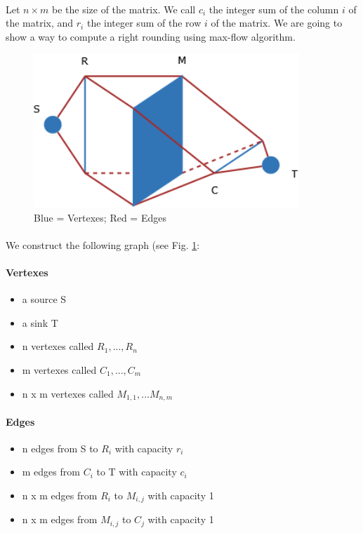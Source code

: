 \paragraph{} 
Let $n\times m$ be the size of the matrix. We call $c_i$ the integer sum of the column $i$ of the matrix, and $r_i$ the integer sum of the row $i$ of the matrix. We are going to show a way to compute a right rounding using max-flow algorithm.

\begin{figure}[h]
	\centering
		\includegraphics[width=10cm]{Diagramme1.png}
	\caption{Blue = Vertexes; Red = Edges}
	\label{fig:Diagramme1}
\end{figure}

\paragraph{}
We construct the following graph (see Fig. \ref{fig:Diagramme1}:
\paragraph{Vertexes}
\begin{itemize}
\item a source S
\item a sink T
\item n vertexes called $R_1,...,R_n$
\item m vertexes called $C_1,...,C_m$
\item n x m vertexes called $M_{1,1},...M_{n,m}$
\end{itemize}

\paragraph{Edges}
\begin{itemize}
\item n edges from S to $R_i$ with capacity $r_i$
\item m edges from $C_i$ to T with capacity $c_i$
\item n x m edges from $R_i$ to $M_{i,j}$ with capacity 1
\item n x m edges from $M_{i,j}$ to $C_j$ with capacity 1
\end{itemize}


